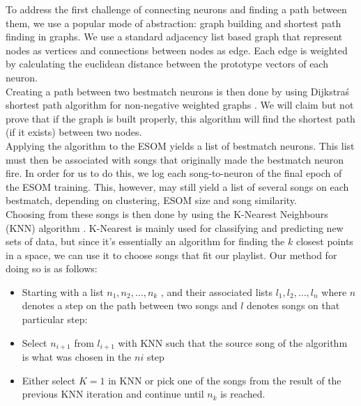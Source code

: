 To address the first challenge of connecting neurons and finding a path between them, we use a popular mode of abstraction: graph building and shortest path finding in graphs. We use a standard adjacency list based graph \citep{algs4} that represent nodes as vertices and connections between nodes as edge. Each edge is weighted by calculating the euclidean distance between the prototype vectors of each neuron. \\
Creating a path between two bestmatch neurons is then done by using Dijkstra\'s shortest path algorithm for non-negative weighted graphs \citep{algs4}. We will claim but not prove that if the graph is built properly, this algorithm will find the shortest path (if it exists) between two nodes. \\

Applying the algorithm to the ESOM yields a list of bestmatch neurons. This list must then be associated with songs that originally made the bestmatch neuron fire. In order for us to do this, we log each song-to-neuron of the final epoch of the ESOM training. This, however, may still yield a list of several songs on each bestmatch, depending on clustering, ESOM size and song similarity. \\
Choosing from these songs is then done by using the K-Nearest Neighbours (KNN) algorithm \citep{han12}. K-Nearest is mainly used for classifying and predicting new sets of data, but since it's essentially an algorithm for finding the $k$ closest points in a space, we can use it to choose songs that fit our playlist. Our method for doing so is as follows:

\begin{itemize}
\item Starting with a list $ n_1, n_2, \dots, n_k $ , and their associated lists $ l_1, l_2, \dots, l_n $ where $n$ denotes a step on the path between two songs and $l$ denotes songs on that particular step: \\
\item Select $ n_{i+1} $ from $ l_{i+1} $ with KNN such that the source song of the algorithm is what was chosen in the $ n{i} $ step \\
\item Either select $K = 1$ in KNN or pick one of the songs from the result of the previous KNN iteration and continue until $n_k$ is reached.\\
\end{itemize}

